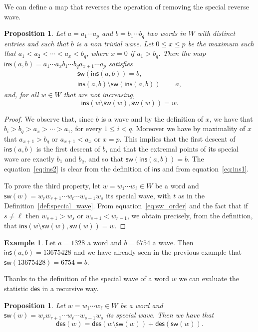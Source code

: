 \documentclass[a4paper]{amsart}
\newcommand{\des}{\mathsf{des}}
\newcommand{\sw}{\mathsf{sw}}
\newcommand{\ins}{\mathsf{ins}}
\newtheorem{proposition}[theorem]{Proposition}
\theoremstyle{definition}
\newtheorem{example}[theorem]{Example}
\theoremstyle{remark}
\numberwithin{equation}{section}
\begin{document}
We can define a map that reverses the operation of removing the special reverse wave.

\begin{proposition}\label{prop:inv}
Let $a=a_1\cdots a_p$ and $b=b_1\cdots b_q$ two words in $W$ with distinct entries and such that $b$ is a non trivial wave. Let $0\leq x\leq p$ be the maximum such that $a_1<a_2<\cdots<a_x<b_q$, where $x=0$ if $a_1>b_q$. Then the map $\ins(a,b)=a_1\cdots a_xb_1\cdots b_qa_{x+1}\cdots a_p$ satisfies
\begin{align}\label{eq:ins1}
    \sw(\ins(a,b))=b,\\
    \ins(a,b)\setminus\sw(\ins(a,b))&=a,\label{eq:ins2}
\end{align}
and, for all $w\in W$ that are not increasing,
\begin{equation}\label{eq:ins3}
    \ins(w\setminus\sw(w),\sw(w))=w.
\end{equation}
\end{proposition}

\begin{proof}
We observe that, since $b$ is a wave and by the definition of $x$, we have that $b_i>b_q>a_x>\cdots>a_1$, for every $1\leq i<q$. Moreover we have by maximality of $x$ that $a_{x+1}>b_q$ or $a_{x+1}<a_x$ or $x=p$. This implies that the first descent of $\ins(a,b)$ is the first descent of $b$, and that the extremal points of its special wave are exactly $b_1$ and $b_q$, and so that $\sw(\ins(a,b))=b$. The equation~\eqref{eq:ins2} is clear from the definition of $\ins$ and from equation~\eqref{eq:ins1}.

To prove the third property, let $w=w_1\cdots w_{\ell}\in W$ be a word and $\sw(w)=w_rw_{r+1}\cdots w_t\cdots w_{s-1}w_s$ its special wave, with $t$ as in the Definition~\ref{def:special_wave}. From equation~\eqref{eq:sw_order} and the fact that if $s\neq\ell$ then $w_{s+1}>w_s$ or $w_{s+1}<w_{r-1}$, we obtain precisely, from the definition, that $\ins(w\setminus\sw(w),\sw(w))=w$.
\end{proof}

\begin{example}
    Let $a=1328$ a word and $b=6754$ a wave. Then $\ins(a,b)=13675428$ and we have already seen in the previous example that $\sw(13675428)=6754=b$. 
\end{example}

Thanks to the definition of the special wave of a word $w$ we can evaluate the statistic $\des$ in a recursive way.

\begin{proposition}\label{prop:des_spezza}
Let $w=w_1\cdots w_{\ell}\in W$ be a word and $\sw(w)=w_rw_{r+1}\cdots w_t\cdots w_{s-1}w_s$ its special wave. Then we have that
\begin{equation}\label{eq:des_spezza}
\des(w)=\des(w\setminus\sw(w))+\des(\sw(w)).
\end{equation}   
\end{proposition}
\end{document}
